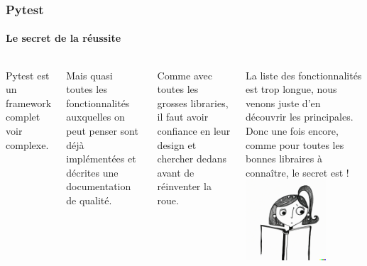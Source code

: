 \documentclass{beamer}
\begin{document}
    \begin{frame}[fragile]
        \frametitle{Pytest}
        \framesubtitle{Le secret de la réussite}
        \transdissolve
        \begin{columns}
            Pytest est un framework complet voir complexe.

            Mais quasi toutes les fonctionnalités auxquelles on peut penser sont déjà implémentées et décrites une documentation de qualité.

            Comme avec toutes les grosses libraries, il faut avoir confiance en leur design et chercher dedans avant de réinventer la roue.

            La liste des fonctionnalités est trop longue, nous venons juste d'en découvrir les principales.
            \bigbreak
            Donc une fois encore, comme pour toutes les bonnes libraires à connaître, le secret est  !
            \centering
            \includegraphics[width=3cm]{image/girl-rtfm.png}
        \end{columns}

    \end{frame}
\end{document}
